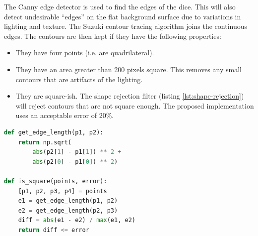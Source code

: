 \documentclass[conference]{IEEEtran}
\begin{document}
The Canny edge detector \cite{Canny1986} is used to find the edges of the dice.
This will also detect undesirable ``edges'' on the flat background surface due to variations in lighting and texture.
The Suzuki contour tracing algorithm \cite{Suzuki1985} joins the continuous edges.
The contours are then kept if they have the following properties:
\begin{itemize}
	\item They have four points (i.e. are quadrilateral).
	\item They have an area greater than 200 pixels square. This removes any small contours that are artifacts of the lighting.
	\item They are square-ish. The shape rejection filter (listing \ref{lst:shape-rejection}) will reject contours that are not square enough.
		The proposed implementation uses an acceptable error of 20\%.
\end{itemize}
\begin{lstlisting}[language=python, caption={The shape rejection filter in Python.}, label={lst:shape-rejection}]
def get_edge_length(p1, p2):
    return np.sqrt(
    	abs(p2[1] - p1[1]) ** 2 +
    	abs(p2[0] - p1[0]) ** 2)

def is_square(points, error):
    [p1, p2, p3, p4] = points
    e1 = get_edge_length(p1, p2)
    e2 = get_edge_length(p2, p3)
    diff = abs(e1 - e2) / max(e1, e2)
    return diff <= error
\end{lstlisting}
%		
%
\end{document}
